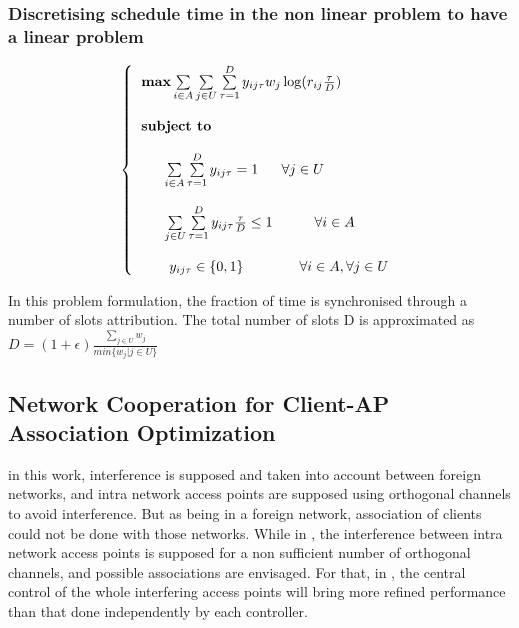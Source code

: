 \documentclass[journal,transmag]{IEEEtran}
\begin{document}
\subsubsection{Discretising schedule time in the non linear problem to have a linear problem}
\begin{footnotesize}
\begin{equation}
\left\{
\begin{tabular}{l} 
$\textbf{max}  \sum\limits_{i \in A} \sum\limits_{j \in U} \sum\limits_{\tau =1}^D y_{ij\tau} w_j   \log (r_{ij} \frac{\tau}{D}) $ \\         
\\
\textbf{subject to} \\

\\
~~~~~$ \sum\limits_{i \in A} \sum\limits_{\tau =1}^D y_{ij\tau} = 1 $ ~~~ $\forall j \in U $  \\

\\
~~~~~$ \sum\limits_{j \in U} \sum\limits_{\tau =1}^D y_{ij\tau} \frac{\tau}{D} \leq 1 ~~~~~~~~~ \forall i \in A $ \\ 

\\
~~~~~ $y_{ij\tau} \in \{0,1\} ~~~~~~~~~~~~ \forall i \in A, \forall j \in U $ \\

\end{tabular}
\right.
\end{equation}
\end{footnotesize}

In this problem formulation, the fraction of time is synchronised through a number of slots attribution. The total number of slots D is approximated as  $D=(1+\epsilon) \frac{\sum\limits_{j \in U} w_j}{min \{ w_j|j \in U\}}$


\subsection{Network Cooperation for Client-AP Association Optimization \cite{12Network_cooperation_AP_association}}

in this work, interference is supposed and taken into account between foreign networks, and intra network access points are supposed using orthogonal channels to avoid interference. But as being in a foreign network, association of clients could not be done with those networks. While in \cite{14optimalAP_INFOCOM}, the interference between intra network access points is supposed for a non sufficient number of orthogonal channels, and possible associations are envisaged. For that, in \cite{14optimalAP_INFOCOM}, the central control of the whole interfering access points will bring more refined performance than that done independently by each controller. 
\end{document}
